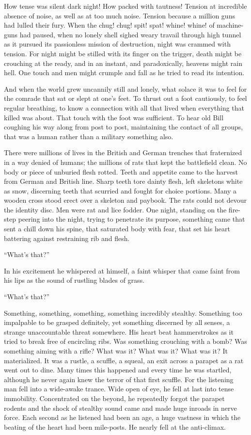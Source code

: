 How tense was silent dark night! How packed with tautness! Tension at incredible absence of noise, as well as at too much noise. Tension because a million guns had lulled their fury. When the chug! chug! spit! spat! whine! whine! of machine-guns had paused, when no lonely shell sighed weary travail through high tunnel as it pursued its passionless mission of destruction, night was crammed with tension. For night might be stilled with its finger on the trigger, death might be crouching at the ready, and in an instant, and paradoxically, heavens might rain hell. One touch and men might crumple and fall as he tried to read its intention.

And when the world grew uncannily still and lonely, what solace it was to feel for the comrade that sat or slept at one's feet. To thrust out a foot cautiously, to feel regular breathing, to know a connection with all that lived when everything that killed was about. That touch with the foot was sufficient. To hear old Bill coughing his way along from post to post, maintaining the contact of all groups, that was a human rather than a military something also.

There were millions of lives in the British and German trenches that fraternized in a way denied of humans; the millions of rats that kept the battlefield clean. No body or piece of unburied flesh rotted. Teeth and appetite came to the harvest from German and British line. Sharp teeth tore dainty flesh, left skeletons white as snow, discerning teeth that scurried and fought for choice portions. Many a wooden cross stood erect over a skeleton and paybook. The rats could not devour the identity disc. Men were rat and lice fodder. One night, standing on the fire-step peering into the night, trying to penetrate its purpose, something came that sent a chill down his spine, that saturated body with fear, that set his heart battering against restraining rib and flesh.

``What's that?''

In his excitement he whispered at himself, a faint whisper that came faint from his lips as the sound of rustling blades of grass.

``What's that?''

Something, something, something, something incredibly stealthy. Something too impalpable to be grasped definitely, yet something discerned by all senses, a strange unaccountable threat somewhere. His heart beat hammerstrokes as it tried to break free of encircling ribs. Was something crouching with a bomb? Was something aiming with a rifle? What was it? What was it? What was it? It materialized. It was a rustle, a scuffle, a squeal, an exit across a parapet as a rat went out to dine. Many times this happened and every time he was startled, although he never again knew the terror of that first scuffle. For the listening man fell into a wide-awake trance. Wide open of eye, he fell at last into tense immobility. Concentrated on the beyond, he repeatedly forgot the parapet rodents and the shock of stealthy sound came and made huge inroads in nerve force. Each second as he listened had been an age, a huge vastness in which the beating of the heart had been mile-posts. He nearly fell at the anti-climax.


